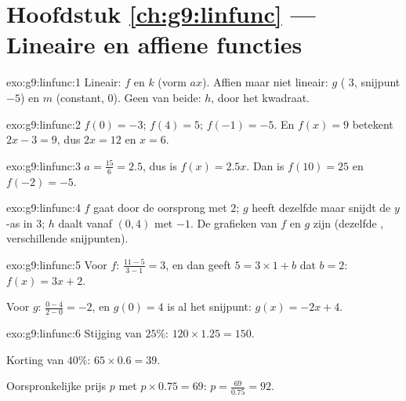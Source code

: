 \section*{Hoofdstuk \ref{ch:g9:linfunc} --- Lineaire en affiene functies}

\begin{solution}{exo:g9:linfunc:1}
Lineair: $f$ en $k$ (vorm $ax$). Affien maar niet lineair: $g$
( $3$, snijpunt $-5$) en $m$ (constant,
 $0$). Geen van beide: $h$, door het kwadraat.
\end{solution}

\begin{solution}{exo:g9:linfunc:2}
$f(0) = -3$; $f(4) = 5$; $f(-1) = -5$. En $f(x) = 9$ betekent $2x - 3 = 9$, dus
$2x = 12$ en $x = 6$.
\end{solution}

\begin{solution}{exo:g9:linfunc:3}
$a = \frac{15}{6} = 2.5$, dus is $f(x) = 2.5x$. Dan is $f(10) = 25$ en
$f(-2) = -5$.
\end{solution}

\begin{solution}{exo:g9:linfunc:4}
$f$ gaat door de oorsprong met  $2$; $g$ heeft dezelfde
 maar snijdt de $y$-as in $3$; $h$ daalt vanaf $(0, 4)$ met
 $-1$. De grafieken van $f$ en $g$ zijn \emph{} (dezelfde , verschillende snijpunten).
\end{solution}

\begin{solution}{exo:g9:linfunc:5}
Voor $f$:  $\frac{11 - 5}{3 - 1} = 3$, en dan geeft
$5 = 3 \times 1 + b$ dat $b = 2$: $f(x) = 3x + 2$.

Voor $g$:  $\frac{0 - 4}{2 - 0} = -2$, en $g(0) = 4$ is al het
snijpunt: $g(x) = -2x + 4$.
\end{solution}

\begin{solution}{exo:g9:linfunc:6}
Stijging van $25\%$: $120 \times 1.25 = 150$.

Korting van $40\%$: $65 \times 0.6 = 39$.

Oorspronkelijke prijs $p$ met $p \times 0.75 = 69$: $p = \frac{69}{0.75} = 92$.
\end{solution}

